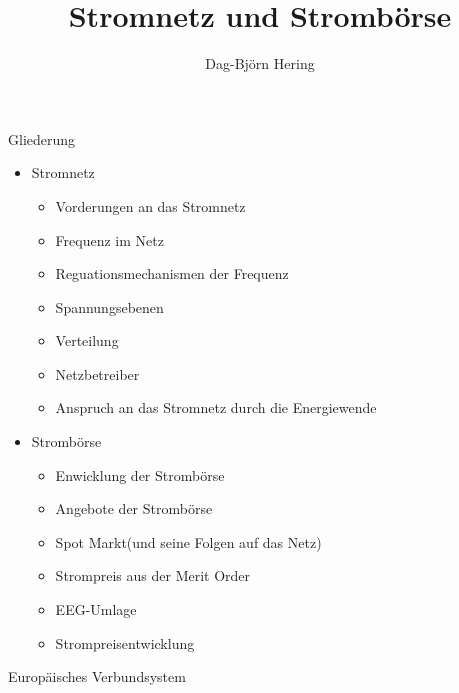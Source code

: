 \documentclass[aspectratio=1610, professionalfonts, 9pt]{beamer}
\title{Stromnetz und Strombörse}
\author[D.~Hering]{Dag-Björn Hering}
\begin{document}
\maketitle
\begin{frame}
\end{frame}

\begin{frame}{Gliederung}
\begin{itemize}
  \item Stromnetz
  \begin{itemize}
  \item Vorderungen an das Stromnetz
  \item Frequenz im Netz
  \item Reguationsmechanismen der Frequenz
  \item Spannungsebenen
  \item Verteilung
  \item Netzbetreiber
  \item Anspruch an das Stromnetz durch die Energiewende
  \end{itemize}
\end{itemize}
\end{frame}
\begin{frame}
\begin{itemize}
 \item Strombörse
\begin{itemize}
  \item Enwicklung der Strombörse
  \item Angebote der Strombörse
  \item Spot Markt(und seine Folgen auf das Netz)
  \item Strompreis aus der Merit Order
  \item EEG-Umlage
  \item Strompreisentwicklung
\end{itemize}
\end{itemize}
\end{frame}



\begin{frame}{Europäisches Verbundsystem}
\end{frame}
\end{document}
